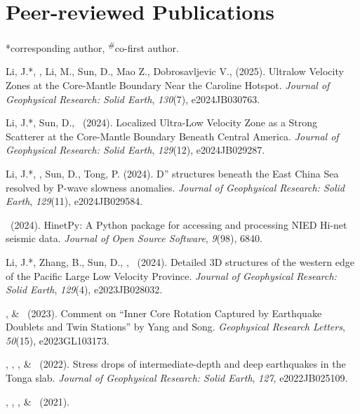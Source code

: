 \section{Peer-reviewed Publications}
\newcommand{\Revision}{\emph{under revision}}
\newcommand{\CS}{*} %
\newcommand{\CF}{\textsuperscript{\#}} %

\CS corresponding author, \CF co-first author.
\begin{etaremune}
\item Li, J.\CS, \Me\CS, Li, M., Sun, D., Mao Z., Dobrosavljevic V., (2025).
    Ultralow Velocity Zones at the Core-Mantle Boundary Near the Caroline Hotspot.
    \emph{Journal of Geophysical Research: Solid Earth}, \emph{130}(7), e2024JB030763.
\item Li, J.\CS, Sun, D., \Me\ (2024).
    Localized Ultra-Low Velocity Zone as a Strong Scatterer at the Core-Mantle Boundary Beneath Central America.
    \emph{Journal of Geophysical Research: Solid Earth}, \emph{129}(12), e2024JB029287.
\item Li, J.\CS, \Me, Sun, D., Tong, P. (2024).
    D'' structures beneath the East China Sea resolved by P-wave slowness anomalies.
    \emph{Journal of Geophysical Research: Solid Earth}, \emph{129}(11), e2024JB029584.
\item \Me\ (2024).
    HinetPy: A Python package for accessing and processing NIED Hi-net seismic data.
    \emph{Journal of Open Source Software}, \emph{9}(98), 6840.
\item Li, J.\CS, Zhang, B., Sun, D., \Me, \JYao\ (2024).
    Detailed 3D structures of the western edge of the Pacific Large Low Velocity Province.
    \emph{Journal of Geophysical Research: Solid Earth}, \emph{129}(4), e2023JB028032.
\item \Me\CS, \& \LWen\ (2023).
    Comment on ``Inner Core Rotation Captured by Earthquake Doublets and Twin Stations'' by Yang and Song.
    \emph{Geophysical Research Letters}, \emph{50}(15), e2023GL103173.
\item \Me\CS, \SWei\CS, \WWang, \& \FWang\ (2022).
    Stress drops of intermediate-depth and deep earthquakes in the Tonga slab.
    \emph{Journal of Geophysical Research: Solid Earth}, \emph{127}, e2022JB025109.
\item \JYao\CS, \Me, \LSun, \& \LWen\ (2021).

\end{etaremune}
